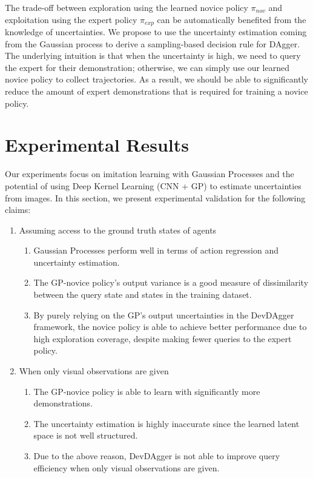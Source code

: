 \documentclass[11pt, reqno, letterpaper, twoside]{amsart}
\begin{document}
The trade-off between exploration using the learned novice policy $\pi_{nov}$ and exploitation using the expert policy $\pi_{exp}$ can be automatically benefited from the knowledge of uncertainties. We propose to use the uncertainty estimation coming from the Gaussian process to derive a sampling-based decision rule for DAgger. The underlying intuition is that when the uncertainty is high, we need to query the expert for their demonstration; otherwise, we can simply use our learned novice policy to collect trajectories. As a result, we should be able to significantly reduce the amount of expert demonstrations that is required for training a novice policy.


\section{Experimental Results}
Our experiments focus on imitation learning with Gaussian Processes and the potential of using Deep Kernel Learning (CNN + GP) to estimate uncertainties from images. In this section, we present experimental validation for the following claims:
\begin{enumerate}
	\item Assuming access to the ground truth states of agents
	      \begin{enumerate}
		      \item Gaussian Processes perform well in terms of action regression and uncertainty estimation.
		      \item The GP-novice policy’s output variance is a good measure of dissimilarity between the query state and states in the training dataset.
		      \item By purely relying on the GP's output uncertainties in the DevDAgger framework, the novice policy is able to achieve better performance due to high exploration coverage, despite making fewer queries to the expert policy.
	      \end{enumerate}

	\item When only visual observations are given
	      \begin{enumerate}
		      \item The GP-novice policy is able to learn with significantly more demonstrations.
		      \item The uncertainty estimation is highly inaccurate since the learned latent space is not well structured.
		      \item Due to the above reason, DevDAgger is not able to improve query efficiency when only visual observations are given.
	      \end{enumerate}
\end{enumerate}
\end{document}
